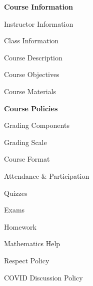 \documentclass[11pt,letterpaper]{article}
\begin{document}
\mytitle




\begin{minipage}[t]{0.45\textwidth}
{\bfseries\color{stacred} Course Information} \dotfill \pageref{course_info} \par
\hspace{0.3cm} Instructor Information \dotfill \pageref{instr_info} \par
\hspace{0.3cm} Class Information \dotfill \pageref{class_info} \par
\hspace{0.3cm} Course Description \dotfill \pageref{course_desc} \par
\hspace{0.3cm} Course Objectives \dotfill \pageref{course_obj} \par
\hspace{0.3cm} Course Materials \dotfill \pageref{course_mat} \par
{\bfseries\color{stacred} Course Policies} \dotfill \pageref{course_polc} \par
\hspace{0.3cm} Grading Components \dotfill \pageref{grade_comp} \par
\hspace{0.3cm} Grading Scale \dotfill \pageref{grade_scale} \par
\hspace{0.3cm} Course Format \dotfill \pageref{course_form} \par
\hspace{0.3cm} Attendance \& Participation \dotfill \pageref{attend} \par
\hspace{0.3cm} Quizzes \dotfill \pageref{quiz} \par
\hspace{0.3cm} Exams \dotfill \pageref{exams} \par
\hspace{0.3cm} Homework \dotfill \pageref{hw} \par
\hspace{0.3cm} Mathematics Help \dotfill \pageref{help} \par
\hspace{0.3cm} Respect Policy \dotfill \pageref{respect} \par
\hspace{0.3cm} COVID Discussion Policy \dotfill \pageref{covid_disc} \par

\end{minipage}
\end{document}
